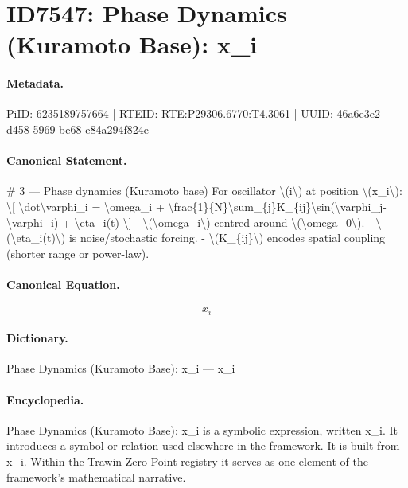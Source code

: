 \section*{ID7547: Phase Dynamics (Kuramoto Base): x\_i}
\paragraph{Metadata.}
PiID: 6235189757664 | RTEID: RTE:P29306.6770:T4.3061 | UUID: 46a6e3e2-d458-5969-be68-e84a294f824e

\paragraph{Canonical Statement.}
\# 3 — Phase dynamics (Kuramoto base) For oscillator \textbackslash{}(i\textbackslash{}) at position \textbackslash{}(x\_i\textbackslash{}): \textbackslash{}[ \textbackslash{}dot\textbackslash{}varphi\_i = \textbackslash{}omega\_i + \textbackslash{}frac\{1\}\{N\}\textbackslash{}sum\_\{j\}K\_\{ij\}\textbackslash{}sin(\textbackslash{}varphi\_j-\textbackslash{}varphi\_i) + \textbackslash{}eta\_i(t) \textbackslash{}] - \textbackslash{}(\textbackslash{}omega\_i\textbackslash{}) centred around \textbackslash{}(\textbackslash{}omega\_0\textbackslash{}). - \textbackslash{}(\textbackslash{}eta\_i(t)\textbackslash{}) is noise/stochastic forcing. - \textbackslash{}(K\_\{ij\}\textbackslash{}) encodes spatial coupling (shorter range or power-law).

\paragraph{Canonical Equation.}
\[
x_i
\]

\paragraph{Dictionary.}
Phase Dynamics (Kuramoto Base): x\_i — x\_i

\paragraph{Encyclopedia.}
Phase Dynamics (Kuramoto Base): x\_i is a symbolic expression, written x\_i. It introduces a symbol or relation used elsewhere in the framework. It is built from x\_i. Within the Trawin Zero Point registry it serves as one element of the framework's mathematical narrative.
